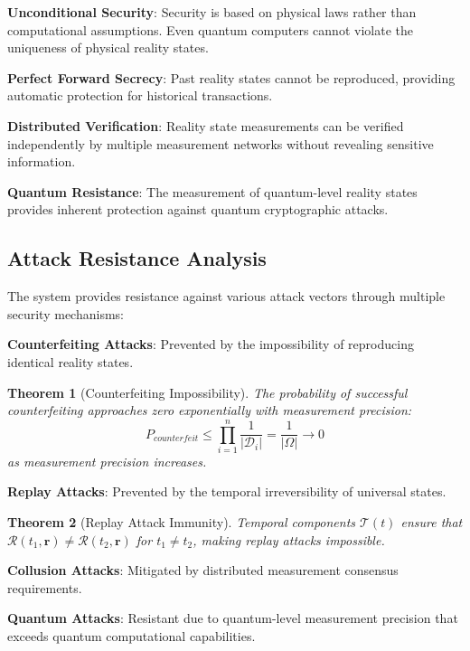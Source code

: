 \documentclass[12pt,a4paper]{article}
\newtheorem{theorem}{Theorem}
\begin{document}
\textbf{Unconditional Security}: Security is based on physical laws rather than computational assumptions. Even quantum computers cannot violate the uniqueness of physical reality states.

\textbf{Perfect Forward Secrecy}: Past reality states cannot be reproduced, providing automatic protection for historical transactions.

\textbf{Distributed Verification}: Reality state measurements can be verified independently by multiple measurement networks without revealing sensitive information.

\textbf{Quantum Resistance}: The measurement of quantum-level reality states provides inherent protection against quantum cryptographic attacks.

\subsection{Attack Resistance Analysis}

The system provides resistance against various attack vectors through multiple security mechanisms:

\textbf{Counterfeiting Attacks}: Prevented by the impossibility of reproducing identical reality states.

\begin{theorem}[Counterfeiting Impossibility]
The probability of successful counterfeiting approaches zero exponentially with measurement precision:
\begin{equation}
P_{counterfeit} \leq \prod_{i=1}^{n} \frac{1}{|\mathcal{D}_i|} = \frac{1}{|\Omega|} \to 0
\end{equation}
as measurement precision increases.
\end{theorem}

\textbf{Replay Attacks}: Prevented by the temporal irreversibility of universal states.

\begin{theorem}[Replay Attack Immunity]
Temporal components $\mathcal{T}(t)$ ensure that $\mathcal{R}(t_1, \mathbf{r}) \neq \mathcal{R}(t_2, \mathbf{r})$ for $t_1 \neq t_2$, making replay attacks impossible.
\end{theorem}

\textbf{Collusion Attacks}: Mitigated by distributed measurement consensus requirements.

\textbf{Quantum Attacks}: Resistant due to quantum-level measurement precision that exceeds quantum computational capabilities.
\end{document}
